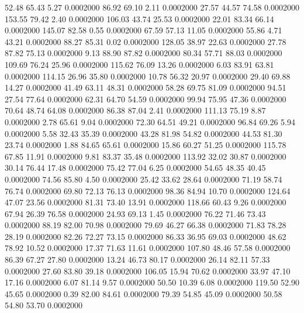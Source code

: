   52.48   65.43    5.27   0.0002000
  86.92   69.10    2.11   0.0002000
  27.57   44.57   74.58   0.0002000
 153.55   79.42    2.40   0.0002000
 106.03   43.74   25.53   0.0002000
  22.01   83.34   66.14   0.0002000
 145.07   82.58    0.55   0.0002000
  67.59   57.13   11.05   0.0002000
  55.86    4.71   43.21   0.0002000
  88.27   85.31    0.02   0.0002000
 128.05   38.97   22.63   0.0002000
  27.78   87.82   75.13   0.0002000
   9.13   88.90   87.82   0.0002000
  80.34   57.71   88.03   0.0002000
 109.69   76.24   25.96   0.0002000
 115.62   76.09   13.26   0.0002000
   6.03   83.91   63.81   0.0002000
 114.15   26.96   35.80   0.0002000
  10.78   56.32   20.97   0.0002000
  29.40   69.88   14.27   0.0002000
  41.49   63.11   48.31   0.0002000
  58.28   69.75   81.09   0.0002000
  94.51   27.54   77.64   0.0002000
  62.31   64.70   54.59   0.0002000
  99.94   75.95   47.36   0.0002000
  70.64   48.74   64.08   0.0002000
  86.38   87.04    2.41   0.0002000
 111.13   75.19    8.87   0.0002000
   2.78   65.61    9.04   0.0002000
  72.30   64.51   49.21   0.0002000
  96.84   69.26    5.94   0.0002000
   5.58   32.43   35.39   0.0002000
  43.28   81.98   54.82   0.0002000
  44.53   81.30   23.74   0.0002000
   1.88   84.65   65.61   0.0002000
  15.86   60.27   51.25   0.0002000
 115.78   67.85   11.91   0.0002000
   9.81   83.37   35.48   0.0002000
 113.92   32.02   30.87   0.0002000
  30.14   76.44   17.48   0.0002000
  75.42   77.04    6.25   0.0002000
  54.65   48.35   40.45   0.0002000
  74.56   85.80    4.50   0.0002000
  25.42   33.62   28.64   0.0002000
  71.19   58.74   76.74   0.0002000
  69.80   72.13   76.13   0.0002000
  98.36   84.94   10.70   0.0002000
 124.64   47.07   23.56   0.0002000
  81.31   73.40   13.91   0.0002000
 118.66   60.43    9.26   0.0002000
  67.94   26.39   76.58   0.0002000
  24.93   69.13    1.45   0.0002000
  76.22   71.46   73.43   0.0002000
  88.19   82.00   70.98   0.0002000
  79.69   46.27   66.38   0.0002000
  71.83   78.28   28.19   0.0002000
  82.26   72.27   73.15   0.0002000
  86.33   36.95   69.03   0.0002000
  48.62   78.92   10.52   0.0002000
  17.37   71.63   11.61   0.0002000
 107.80   48.46   57.58   0.0002000
  86.39   67.27   27.80   0.0002000
  13.24   46.73   80.17   0.0002000
  26.14   82.11   57.33   0.0002000
  27.60   83.80   39.18   0.0002000
 106.05   15.94   70.62   0.0002000
  33.97   47.10   17.16   0.0002000
   6.07   81.14    9.57   0.0002000
  50.50   10.39    6.08   0.0002000
 119.50   52.90   45.65   0.0002000
   0.39   82.00   84.61   0.0002000
  79.39   54.85   45.09   0.0002000
  50.58   54.80   53.70   0.0002000

